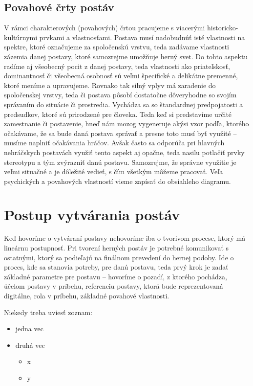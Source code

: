 \documentclass[10pt,twoside,slovak,a4paper]{article}
\begin{document}
\subsection{Povahové črty postáv}\label{3.0:3.2}
V rámci charakterových (povahových) črtou pracujeme s viacerými historicko-kultúrnymi prvkami a vlastnosťami. Postava musí nadobudnúť isté vlastnosti na spektre, ktoré označujeme za spoločenskú vrstvu, teda zadávame vlastnosti zázemia danej postavy, ktoré samozrejme umožňuje herný svet. Do tohto aspektu radíme aj všeobecný pocit z danej postavy, teda vlastnosti ako priateľskosť, dominantnosť či všeobecná osobnosť sú veľmi špecifické a delikátne premenné, ktoré meníme a upravujeme. Rovnako tak silný vplyv má zaradenie do spoločenskej vrstvy, teda či postava pôsobí dostatočne dôveryhodne so svojím správaním do situácie či prostredia. Vychádza sa so štandardnej predpojatosti a predsudkov, ktoré sú prirodzené pre človeka. Teda keď si predstavíme určité zamestnanie či postavenie, hneď nám mozog vygeneruje akýsi vzor podľa, ktorého očakávame, že sa bude daná postava správať a presne toto musí byť využité – musíme naplniť očakávania hráčov. Avšak často sa odporúča pri hlavných nehráčskych postavách využiť tento aspekt aj opačne, teda nasilu potlačiť prvky stereotypu a tým zvýrazniť danú postavu. Samozrejme, že správne využitie je veľmi situačné a je dôležité vedieť, s čím všetkým môžeme pracovať. Veľa psychických a povahových vlastností vieme zapísať do obsiahleho diagramu.
\section{Postup vytvárania postáv}\label{4.0}
Keď hovoríme o vytváraní postavy nehovoríme iba o tvorivom procese, ktorý má lineárnu postupnosť. Pri tvorení herných postáv je potrebné komunikovať s ostatnými, ktorý sa podieľajú na finálnom prevedení do hernej podoby. Ide o proces, kde sa stanovia potreby, pre danú postavu, teda prvý krok je zadať základné parametre pre postavu – hovoríme o pozadí, z ktorého pochádza, účelom postavy v príbehu, referenciu postavy, ktorá bude reprezentovaná digitálne, rola v príbehu, základné povahové vlastnosti.

Niekedy treba uviesť zoznam:

\begin{itemize}
\item jedna vec
\item druhá vec
	\begin{itemize}
	\item x
	\item y
	\end{itemize}
\end{itemize}
\end{document}
